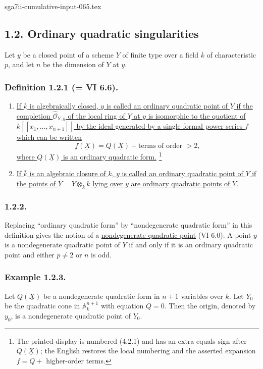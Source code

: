 \begin{filecontents*}{sga7ii-cumulative-input-065.tex}
\subsection*{1.2. Ordinary quadratic singularities}

Let $y$ be a closed point of a scheme $Y$ of finite type over a field
$k$ of characteristic $p$, and let $n$ be the dimension of $Y$ at
$y$.

\subsubsection*{Definition 1.2.1 (= VI 6.6).}
\begin{enumerate}[label=(\roman*),leftmargin=2.6em]
\item \underline{If $k$ is algebraically closed, $y$ is called an
ordinary quadratic point of $Y$ if the completion
$\widehat{\mathcal O}_{Y,y}$ of the local ring of $Y$ at $y$ is
isomorphic to the quotient of $k[[x_1,\ldots,x_{n+1}]]$ by the ideal
generated by a single formal power series $f$ which can be written}
\begin{equation}\tag{1.2.1.1}
f(\underline X)=Q(\underline X)+\text{terms of order }>2,
\end{equation}
\underline{where $Q(\underline X)$ is an ordinary quadratic form.}
\footnote{The printed display is numbered (4.2.1) and has an extra
equals sign after $Q(\underline X)$; the English restores the local
numbering and the asserted expansion $f=Q+$ higher-order terms.}

\item \underline{If $\bar k$ is an algebraic closure of $k$, $y$ is
called an ordinary quadratic point of $Y$ if the points of
$\bar Y=Y\otimes_k\bar k$ lying over $y$ are ordinary quadratic
points of $\bar Y$.}
\end{enumerate}

\subsubsection*{1.2.2.}
Replacing ``ordinary quadratic form'' by ``nondegenerate quadratic
form'' in this definition gives the notion of a
\underline{nondegenerate quadratic point} (VI 6.0).  A point $y$ is
a nondegenerate quadratic point of $Y$ if and only if it is an
ordinary quadratic point and either $p\ne2$ or $n$ is odd.

\subsubsection*{Example 1.2.3.}
Let $Q(\underline X)$ be a nondegenerate quadratic form in $n+1$
variables over $k$.  Let $Y_0$ be the quadratic cone in
$\mathbb A_k^{n+1}$ with equation $Q=0$.  Then the origin, denoted by
$y_0$, is a nondegenerate quadratic point of $Y_0$.


\end{filecontents*}

